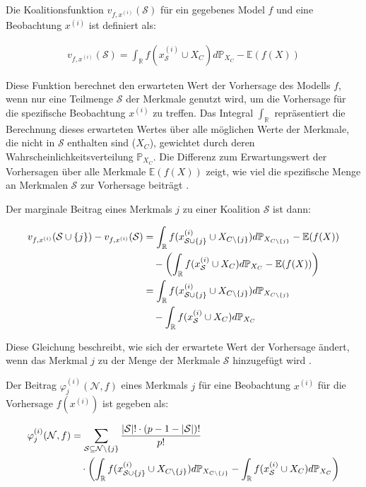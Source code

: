Die Koalitionsfunktion $v_{f, x^{(i)}}(\mathcal{S})$ für ein gegebenes Model $f$ und eine Beobachtung $x^{(i)}$ ist definiert als:

\begin{align}
    v_{f, x^{(i)}}(\mathcal{S}) = \int_{\mathbb{R}} f(x^{(i)}_{\mathcal{S}} \cup X_{C}) d\mathbb{P}_{X_{C}} - \mathbb{E}(f(X))
\end{align}

Diese Funktion berechnet den erwarteten Wert der Vorhersage des Modells $f$, wenn nur eine Teilmenge $\mathcal{S}$ der 
Merkmale genutzt wird, um die Vorhersage für die spezifische Beobachtung $x^{(i)}$ zu treffen. 
Das Integral $\int_{\mathbb{R}}$ repräsentiert die Berechnung dieses erwarteten Wertes über alle möglichen Werte der Merkmale, 
die nicht in $\mathcal{S}$ enthalten sind ($X_C$), gewichtet durch deren Wahrscheinlichkeitsverteilung $\mathbb{P}_{X_{C}}$. 
Die Differenz zum Erwartungswert der Vorhersagen über alle Merkmale $\mathbb{E}(f(X))$ zeigt, 
wie viel die spezifische Menge an Merkmalen $\mathcal{S}$ zur Vorhersage beiträgt \cite[S. 221, S. 27]{Molnar_2022, Molnar_2023}.

Der marginale Beitrag eines Merkmals $j$ zu einer Koalition $\mathcal{S}$ ist dann:

\begin{align}
    v_{f, x^{(i)}}(\mathcal{S} \cup \{j\}) - v_{f, x^{(i)}}(\mathcal{S}) &= \int_{\mathbb{R}} f(x^{(i)}_{\mathcal{S} \cup \{j\}} \cup X_{C \setminus \{j\}}) d\mathbb{P}_{X_{C \setminus \{j\}}} - \mathbb{E}(f(X)) \\ \notag
    &\quad - \left( \int_{\mathbb{R}} f(x^{(i)}_{\mathcal{S}} \cup X_{C}) d\mathbb{P}_{X_{C}} - \mathbb{E}(f(X)) \right) \\ \notag
    &= \int_{\mathbb{R}} f(x^{(i)}_{\mathcal{S} \cup \{j\}} \cup X_{C \setminus \{j\}}) d\mathbb{P}_{X_{C \setminus \{j\}}} \\ \notag
    &\quad - \int_{\mathbb{R}} f(x^{(i)}_{\mathcal{S}} \cup X_{C}) d\mathbb{P}_{X_{C}}
\end{align}

Diese Gleichung beschreibt, wie sich der erwartete Wert der Vorhersage ändert, wenn das Merkmal $j$ zu der Menge der Merkmale $\mathcal{S}$ hinzugefügt wird \cite[S. 29]{Molnar_2023}.

Der Beitrag $\varphi_j^{(i)}(\mathcal{N}, f)$ eines Merkmals $j$ für eine Beobachtung $x^{(i)}$ für die Vorhersage $f(x^{(i)})$ ist gegeben als:

\begin{align}
    \label{eq:shap-eq}
    \varphi^{(i)}_{j} (\mathcal{N}, f) &= \sum_{\mathcal{S} \subseteq \mathcal{N} \setminus \{j\}} \frac{|\mathcal{S}|! \cdot (p - 1 - |\mathcal{S}|)!}{p!} \\ \notag
    &\quad \cdot \left( \int_{\mathbb{R}} f(x^{(i)}_{\mathcal{S} \cup \{j\}} \cup X_{C \setminus \{j\}}) d\mathbb{P}_{X_{C \setminus \{j\}}} -
    \int_{\mathbb{R}} f(x^{(i)}_{\mathcal{S}} \cup X_{C}) d\mathbb{P}_{X_{C}} \right) 
\end{align}

